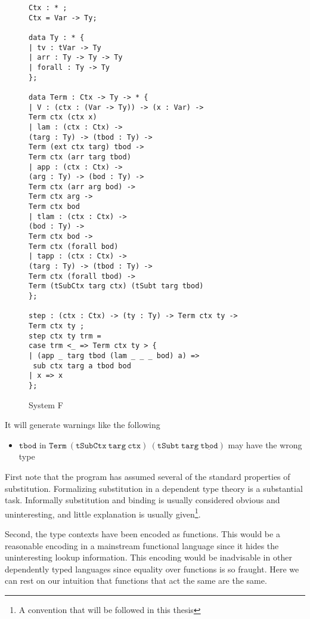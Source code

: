 \begin{figure}
\begin{lstlisting}[basicstyle={\ttfamily\small}]
Ctx : * ;
Ctx = Var -> Ty;

data Ty : * {
| tv : tVar -> Ty
| arr : Ty -> Ty -> Ty
| forall : Ty -> Ty
};

data Term : Ctx -> Ty -> * {
| V : (ctx : (Var -> Ty)) -> (x : Var) ->
Term ctx (ctx x)
| lam : (ctx : Ctx) ->
(targ : Ty) -> (tbod : Ty) ->
Term (ext ctx targ) tbod ->
Term ctx (arr targ tbod)
| app : (ctx : Ctx) ->
(arg : Ty) -> (bod : Ty) ->
Term ctx (arr arg bod) ->
Term ctx arg ->
Term ctx bod
| tlam : (ctx : Ctx) ->
(bod : Ty) ->
Term ctx bod ->
Term ctx (forall bod)
| tapp : (ctx : Ctx) ->
(targ : Ty) -> (tbod : Ty) ->
Term ctx (forall tbod) ->
Term (tSubCtx targ ctx) (tSubt targ tbod)
};

step : (ctx : Ctx) -> (ty : Ty) -> Term ctx ty ->
Term ctx ty ;
step ctx ty trm =
case trm <_ => Term ctx ty > {
| (app _ targ tbod (lam _ _ _ bod) a) =>
 sub ctx targ a tbod bod
| x => x
};
\end{lstlisting}

\caption{System F}
\label{fig:ex-sysf}
\end{figure}

It will generate warnings like the following
\begin{itemize}
\item $\mathtt{tbod}$ in $\mathtt{Term\ (tSubCtx\ targ\ ctx)\ (tSubt\ targ\ \underline{tbod})}$
may have the wrong type
\end{itemize}
First note that the program has assumed several of the standard properties of substitution.
Formalizing substitution in a dependent type theory is a substantial
task\cite{10.1145/3293880.3294101}.
Informally substitution and binding is usually considered obvious and uninteresting, and little explanation is usually given\footnote{A convention that will be followed in this thesis}.

Second, the type contexts have been encoded as functions.
This would be a reasonable encoding in a mainstream functional language since it hides the uninteresting lookup information.
This encoding would be inadvisable in other dependently typed languages since equality over functions is so fraught.
Here we can rest on our intuition that functions that act the same are the same.

